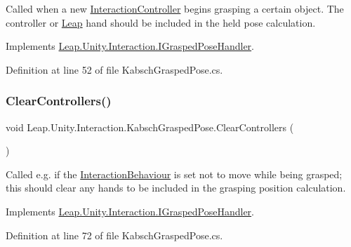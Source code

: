 Called when a new \mbox{\hyperlink{class_leap_1_1_unity_1_1_interaction_1_1_interaction_controller}{Interaction\+Controller}} begins grasping a certain object. The controller or \mbox{\hyperlink{namespace_leap_1_1_unity_1_1_leap}{Leap}} hand should be included in the held pose calculation. 



Implements \mbox{\hyperlink{interface_leap_1_1_unity_1_1_interaction_1_1_i_grasped_pose_handler_ad6b297cf90c878a95ca69901180ab4ce}{Leap.\+Unity.\+Interaction.\+I\+Grasped\+Pose\+Handler}}.



Definition at line 52 of file Kabsch\+Grasped\+Pose.\+cs.

\mbox{\label{class_leap_1_1_unity_1_1_interaction_1_1_kabsch_grasped_pose_a016fe0af189b4caae24050a70b4d2462}} 
\subsubsection{\texorpdfstring{ClearControllers()}{ClearControllers()}}
{\footnotesize\ttfamily void Leap.\+Unity.\+Interaction.\+Kabsch\+Grasped\+Pose.\+Clear\+Controllers (\begin{DoxyParamCaption}{ }\end{DoxyParamCaption})}



Called e.\+g. if the \mbox{\hyperlink{class_leap_1_1_unity_1_1_interaction_1_1_interaction_behaviour}{Interaction\+Behaviour}} is set not to move while being grasped; this should clear any hands to be included in the grasping position calculation. 



Implements \mbox{\hyperlink{interface_leap_1_1_unity_1_1_interaction_1_1_i_grasped_pose_handler_a1f78ffa53ab585a1b283548e4e4381c8}{Leap.\+Unity.\+Interaction.\+I\+Grasped\+Pose\+Handler}}.



Definition at line 72 of file Kabsch\+Grasped\+Pose.\+cs.

\mbox{\label{class_leap_1_1_unity_1_1_interaction_1_1_kabsch_grasped_pose_ad691816b67d028dfc7c69e9c782c6eef}} 
